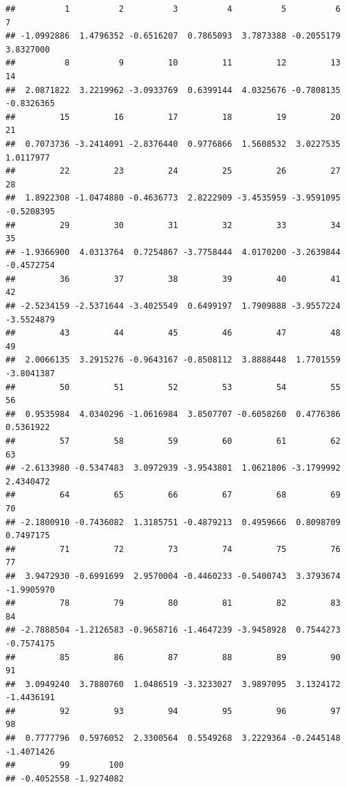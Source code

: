\documentclass[
]{article}
\begin{document}
\begin{verbatim}
##          1          2          3          4          5          6          7 
## -1.0992886  1.4796352 -0.6516207  0.7865093  3.7873388 -0.2055179  3.8327000 
##          8          9         10         11         12         13         14 
##  2.0871822  3.2219962 -3.0933769  0.6399144  4.0325676 -0.7808135 -0.8326365 
##         15         16         17         18         19         20         21 
##  0.7073736 -3.2414091 -2.8376440  0.9776866  1.5608532  3.0227535  1.0117977 
##         22         23         24         25         26         27         28 
##  1.8922308 -1.0474880 -0.4636773  2.8222909 -3.4535959 -3.9591095 -0.5208395 
##         29         30         31         32         33         34         35 
## -1.9366900  4.0313764  0.7254867 -3.7758444  4.0170200 -3.2639844 -0.4572754 
##         36         37         38         39         40         41         42 
## -2.5234159 -2.5371644 -3.4025549  0.6499197  1.7909888 -3.9557224 -3.5524879 
##         43         44         45         46         47         48         49 
##  2.0066135  3.2915276 -0.9643167 -0.8508112  3.8888448  1.7701559 -3.8041387 
##         50         51         52         53         54         55         56 
##  0.9535984  4.0340296 -1.0616984  3.8507707 -0.6058260  0.4776386  0.5361922 
##         57         58         59         60         61         62         63 
## -2.6133980 -0.5347483  3.0972939 -3.9543801  1.0621806 -3.1799992  2.4340472 
##         64         65         66         67         68         69         70 
## -2.1800910 -0.7436082  1.3185751 -0.4879213  0.4959666  0.8098709  0.7497175 
##         71         72         73         74         75         76         77 
##  3.9472930 -0.6991699  2.9570004 -0.4460233 -0.5400743  3.3793674 -1.9905970 
##         78         79         80         81         82         83         84 
## -2.7888504 -1.2126583 -0.9658716 -1.4647239 -3.9458928  0.7544273 -0.7574175 
##         85         86         87         88         89         90         91 
##  3.0949240  3.7880760  1.0486519 -3.3233027  3.9897095  3.1324172 -1.4436191 
##         92         93         94         95         96         97         98 
##  0.7777796  0.5976052  2.3300564  0.5549268  3.2229364 -0.2445148 -1.4071426 
##         99        100 
## -0.4052558 -1.9274082
\end{verbatim}
\end{document}
